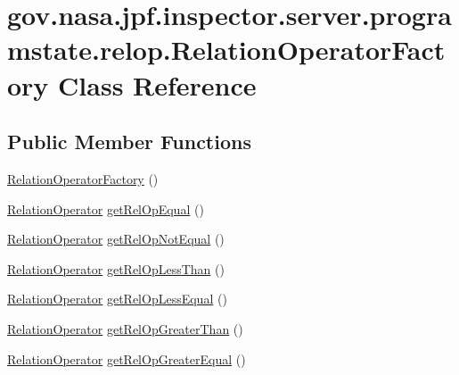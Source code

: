 \hypertarget{classgov_1_1nasa_1_1jpf_1_1inspector_1_1server_1_1programstate_1_1relop_1_1_relation_operator_factory}{}\section{gov.\+nasa.\+jpf.\+inspector.\+server.\+programstate.\+relop.\+Relation\+Operator\+Factory Class Reference}
\label{classgov_1_1nasa_1_1jpf_1_1inspector_1_1server_1_1programstate_1_1relop_1_1_relation_operator_factory}
\subsection*{Public Member Functions}
\begin{DoxyCompactItemize}
\item 
\hyperlink{classgov_1_1nasa_1_1jpf_1_1inspector_1_1server_1_1programstate_1_1relop_1_1_relation_operator_factory_a8ed0dafd8d6be6f46690a857050bc23b}{Relation\+Operator\+Factory} ()
\item 
\hyperlink{interfacegov_1_1nasa_1_1jpf_1_1inspector_1_1server_1_1programstate_1_1relop_1_1_relation_operator}{Relation\+Operator} \hyperlink{classgov_1_1nasa_1_1jpf_1_1inspector_1_1server_1_1programstate_1_1relop_1_1_relation_operator_factory_afd723e85d1abe4c882bdefe857766906}{get\+Rel\+Op\+Equal} ()
\item 
\hyperlink{interfacegov_1_1nasa_1_1jpf_1_1inspector_1_1server_1_1programstate_1_1relop_1_1_relation_operator}{Relation\+Operator} \hyperlink{classgov_1_1nasa_1_1jpf_1_1inspector_1_1server_1_1programstate_1_1relop_1_1_relation_operator_factory_a04eb2662d966f02afbbf64d5fcb7ec9a}{get\+Rel\+Op\+Not\+Equal} ()
\item 
\hyperlink{interfacegov_1_1nasa_1_1jpf_1_1inspector_1_1server_1_1programstate_1_1relop_1_1_relation_operator}{Relation\+Operator} \hyperlink{classgov_1_1nasa_1_1jpf_1_1inspector_1_1server_1_1programstate_1_1relop_1_1_relation_operator_factory_a8576cfdd622b70805167c09f8c3356c3}{get\+Rel\+Op\+Less\+Than} ()
\item 
\hyperlink{interfacegov_1_1nasa_1_1jpf_1_1inspector_1_1server_1_1programstate_1_1relop_1_1_relation_operator}{Relation\+Operator} \hyperlink{classgov_1_1nasa_1_1jpf_1_1inspector_1_1server_1_1programstate_1_1relop_1_1_relation_operator_factory_a6e1f5933078ec8bd28c30127593aabb8}{get\+Rel\+Op\+Less\+Equal} ()
\item 
\hyperlink{interfacegov_1_1nasa_1_1jpf_1_1inspector_1_1server_1_1programstate_1_1relop_1_1_relation_operator}{Relation\+Operator} \hyperlink{classgov_1_1nasa_1_1jpf_1_1inspector_1_1server_1_1programstate_1_1relop_1_1_relation_operator_factory_aa479d3029d1b0ad5abb7f6dd13090af7}{get\+Rel\+Op\+Greater\+Than} ()
\item 
\hyperlink{interfacegov_1_1nasa_1_1jpf_1_1inspector_1_1server_1_1programstate_1_1relop_1_1_relation_operator}{Relation\+Operator} \hyperlink{classgov_1_1nasa_1_1jpf_1_1inspector_1_1server_1_1programstate_1_1relop_1_1_relation_operator_factory_af4e374efc24df8cf554d52567b3a4abb}{get\+Rel\+Op\+Greater\+Equal} ()
\end{DoxyCompactItemize}
